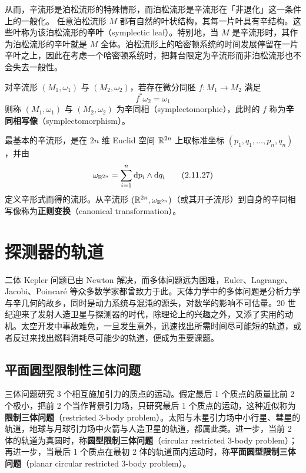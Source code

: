 从而，辛流形是泊松流形的特殊情形，而泊松流形是辛流形在「非退化」这一条件上的一般化。
任意泊松流形 $M$ 都有自然的叶状结构，其每一片叶具有辛结构。这些叶称为该泊松流形的\textbf{辛叶}（symplectic leaf）。特别地，当 $M$ 是辛流形时，其作为泊松流形的辛叶就是 $M$ 全体。泊松流形上的哈密顿系统的时间发展停留在一片辛叶之上，因此在考虑一个哈密顿系统时，把舞台限定为辛流形而非泊松流形也不会失去一般性。

对辛流形 $(M_1,\omega_1)$ 与 $(M_2,\omega_2)$，若存在微分同胚 $f\colon M_1\to M_2$ 满足
\begin{equation}
  f^*\omega_2 = \omega_1
  \tag{2.11.26}
\end{equation}
则称 $(M_1,\omega_1)$ 与 $(M_2,\omega_2)$ 为辛同相（symplectomorphic），此时的 $f$ 称为\textbf{辛同相写像}（symplectomorphism）。

最基本的辛流形，是在 $2n$ 维 Euclid 空间 $\mathbb{R}^{2n}$ 上取标准坐标 $(p_1,q_1,\dots,p_n,q_n)$，并由
\begin{equation}
  \omega_{\mathbb{R}^{2n}} = \sum_{i=1}^{n}\mathrm{d} p_i\wedge\mathrm{d} q_i
  \tag{2.11.27}
\end{equation}
定义辛形式而得的流形。从辛流形 $(\mathbb{R}^{2n},\omega_{\mathbb{R}^{2n}})$（或其开子流形）到自身的辛同相写像称为\textbf{正则变换}（canonical transformation）。


\section{探测器的轨道}

二体 Kepler 问题已由 Newton 解决，而多体问题远为困难，Euler、Lagrange、Jacobi、Poincaré 等众多数学家都曾致力于此。天体力学中的多体问题是分析力学与辛几何的故乡，同时是动力系统与混沌的源头，对数学的影响不可估量。20 世纪迎来了发射人造卫星与探测器的时代，除理论上的兴趣之外，又添了实用的动机。太空开发中事故难免，一旦发生意外，迅速找出所需时间尽可能短的轨道，或者反过来找出燃料消耗尽可能少的轨道，便成为重要课题。


\subsection{平面圆型限制性三体问题}

三体问题研究 3 个相互施加引力的质点的运动。假定最后 1 个质点的质量比前 2 个极小，把前 2 个当作背景引力场，只研究最后 1 个质点的运动，这种近似称为\textbf{限制三体问题}（restricted 3-body problem）。太阳与木星引力场中小行星、彗星的轨道，地球与月球引力场中火箭与人造卫星的轨道，都属此类。进一步，当前 2 体的轨道为真圆时，称\textbf{圆型限制三体问题}（circular restricted 3-body problem）；再进一步，当最后 1 个质点在最初 2 体的轨道面内运动时，称\textbf{平面圆型限制三体问题}（planar circular restricted 3-body problem）。

